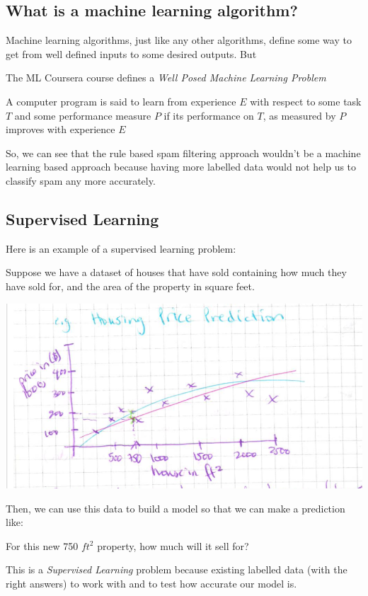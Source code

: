 \documentclass[12pt]{article}
\begin{document}
\subsection{What is a machine learning algorithm?}

Machine learning algorithms, just like any other algorithms, define some way to get from well defined inputs to some desired outputs. But 

The ML Coursera course defines a \textit{Well Posed Machine Learning Problem}

A computer program is said to learn from experience $E$ with respect to some task $T$ and some performance measure $P$ 
if its performance on $T$, as measured by $P$ improves with experience $E$

So, we can see that the rule based spam filtering approach wouldn't be a machine learning based approach because having more labelled data would not help us to classify spam any more accurately.  

\subsection{Supervised Learning}

Here is an example of a supervised learning problem: 

Suppose we have a dataset of houses that have sold containing how much they have sold for, and the area of the property in square feet. 

\includegraphics[width={\textwidth}]{housing-prices}

Then, we can use this data to build a model so that we can make a prediction like:

For this new 750 $ft^2$ property, how much will it sell for?

This is a \textit{Supervised Learning} problem because existing labelled data (with the right answers) to work with and to test how accurate our model is.
\end{document}
